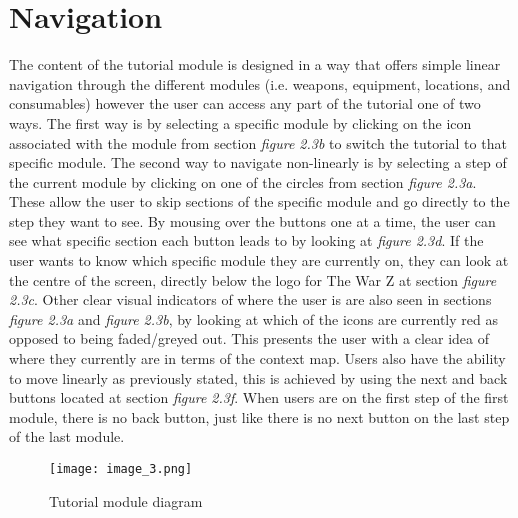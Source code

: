 \documentclass[12pt]{report}
\begin{document}
\section{Navigation}
The content of the tutorial module is designed in a way that offers simple linear navigation through the different modules (i.e. weapons, equipment, locations, and consumables) however the user can access any part of the tutorial one of two ways. The first way is by selecting a specific module by clicking on the icon associated with the module from section \textit{figure 2.3b} to switch the tutorial to that specific module. The second way to navigate non-linearly is by selecting a step of the current module by clicking on one of the circles from section \textit{figure 2.3a}. These allow the user to skip sections of the specific module and go directly to the step they want to see. By mousing over the buttons one at a time, the user can see what specific section each button leads to by looking at \textit{figure 2.3d}. If the user wants to know which specific module they are currently on, they can look at the centre of the screen, directly below the logo for The War Z at section \textit{figure 2.3c}. Other clear visual indicators of where the user is are also seen in sections \textit{figure 2.3a} and \textit{figure 2.3b}, by looking at which of the icons are currently red as opposed to being faded/greyed out. This presents the user with a clear idea of where they currently are in terms of the context map. Users also have the ability to move linearly as previously stated, this is achieved by using the next and back buttons located at section \textit{figure 2.3f}. When users are on the first step of the first module, there is no back button, just like there is no next button on the last step of the last module.
\begin{figure}
\begin{center}
\leavevmode
\texttt{[image: image\_3.png]}
\end{center}
\caption{Tutorial module diagram}
\label{fig:warztutmodlabelled}
\end{figure}
\end{document}

